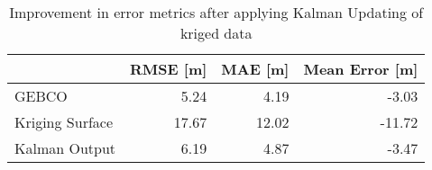 \begin{table}
\centering
\caption{Improvement in error metrics after applying Kalman Updating of kriged data}
\label{tab:oahu6_gebco_raster_error}
\begin{tabular}{lrrr}
\toprule
 & RMSE [m] & MAE [m] & Mean Error [m] \\
\midrule
GEBCO & 5.24 & 4.19 & -3.03 \\
Kriging Surface & 17.67 & 12.02 & -11.72 \\
Kalman Output & 6.19 & 4.87 & -3.47 \\
\bottomrule
\end{tabular}
\end{table}
